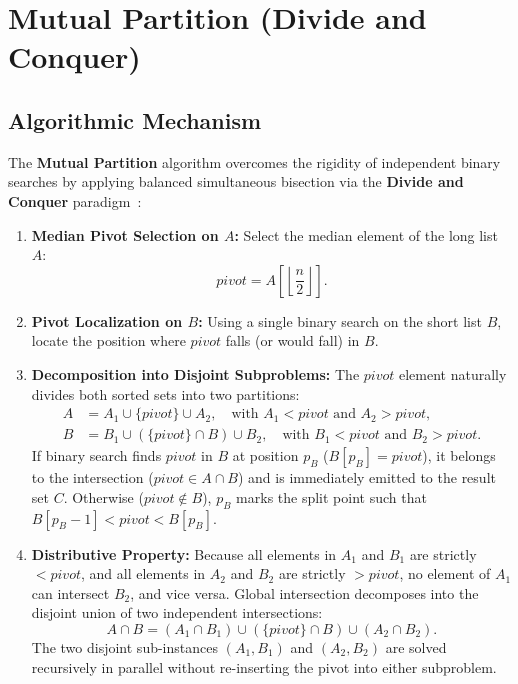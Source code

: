 \FloatBarrier
\section{Mutual Partition (Divide and Conquer)}
\label{sec:mutual-partition-en}

\subsection{Algorithmic Mechanism}
The \textbf{Mutual Partition} algorithm overcomes the rigidity of independent binary searches by applying balanced simultaneous bisection via the \textbf{Divide and Conquer} paradigm~\cite{baezayates2004}:

\begin{enumerate}
  \item \textbf{Median Pivot Selection on $A$:} Select the median element of the long list $A$:
  \begin{equation}
    pivot = A\left[\left\lfloor \frac{n}{2} \right\rfloor\right].
  \end{equation}
  \item \textbf{Pivot Localization on $B$:} Using a single binary search on the short list $B$, locate the position where $pivot$ falls (or would fall) in $B$.
  \item \textbf{Decomposition into Disjoint Subproblems:} The $pivot$ element naturally divides both sorted sets into two partitions:
  \begin{align}
    A &= A_1 \cup \{pivot\} \cup A_2, \quad \text{with } A_1 < pivot \text{ and } A_2 > pivot, \\
    B &= B_1 \cup (\{pivot\} \cap B) \cup B_2, \quad \text{with } B_1 < pivot \text{ and } B_2 > pivot.
  \end{align}
  If binary search finds $pivot$ in $B$ at position $p_B$ ($B[p_B] = pivot$), it belongs to the intersection ($pivot \in A \cap B$) and is immediately emitted to the result set $C$. Otherwise ($pivot \notin B$), $p_B$ marks the split point such that $B[p_B-1] < pivot < B[p_B]$.
  \item \textbf{Distributive Property:} Because all elements in $A_1$ and $B_1$ are strictly $< pivot$, and all elements in $A_2$ and $B_2$ are strictly $> pivot$, no element of $A_1$ can intersect $B_2$, and vice versa. Global intersection decomposes into the disjoint union of two independent intersections:
  \begin{equation}
    A \cap B = (A_1 \cap B_1) \cup (\{pivot\} \cap B) \cup (A_2 \cap B_2).
  \end{equation}
  The two disjoint sub-instances $(A_1, B_1)$ and $(A_2, B_2)$ are solved recursively in parallel without re-inserting the pivot into either subproblem.
\end{enumerate}

